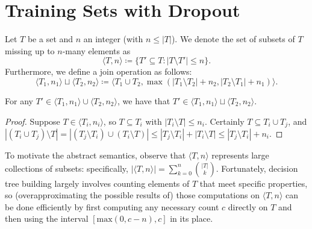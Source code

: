 \section{Training Sets with Dropout}\label{sec:domain}

\begin{definition}
Let $T$ be a set and $n$ an integer (with $n \leq |T|$).
We denote the set of subsets of $T$ missing up to $n$-many elements as
\[
\langle T, n \rangle \coloneqq
\{T' \subseteq T : |T \setminus T'| \leq n\} .
\]
Furthermore, we define a join operation as follows:
\[
\langle T_1, n_1 \rangle \sqcup \langle T_2, n_2 \rangle
\coloneqq \langle T_1 \cup T_2,
\max(|T_1 \setminus T_2| + n_2, |T_2 \setminus T_1| + n_1) \rangle .
\]
\end{definition}

\begin{proposition}
For any $T' \in \langle T_1, n_1 \rangle \cup \langle T_2, n_2 \rangle$,
we have that $T' \in \langle T_1, n_1 \rangle \sqcup \langle T_2, n_2 \rangle$.
\end{proposition}
\begin{proof}
Suppose $T \in \langle T_i, n_i \rangle$,
so $T \subseteq T_i$ with $|T_i \setminus T| \leq n_i$.
Certainly $T \subseteq T_i \cup T_j$,
and $|(T_i \cup T_j) \setminus T| = |(T_j \setminus T_i) \cup (T_i \setminus T)|
\leq |T_j \setminus T_i| + |T_i \setminus T| \leq |T_j \setminus T_i| + n_i$.
\end{proof}

To motivate the abstract semantics,
observe that $\langle T, n \rangle$ represents large collections of subsets:
specifically,
$|\langle T, n \rangle| = \sum_{k = 0}^n \binom{|T|}{k}$.
Fortunately, decision tree building largely involves counting elements of $T$
that meet specific properties,
so (overapproximating the possible results of) those computations
on $\langle T, n \rangle$ can be done efficiently by first computing
any necessary count $c$ directly on $T$ and then using the interval
$[\text{max}(0, c-n), c]$ in its place.
